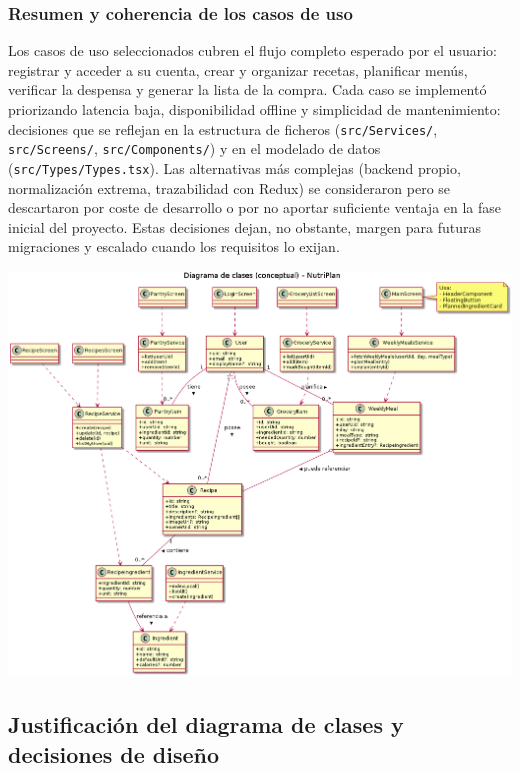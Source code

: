 \documentclass[twoside, openright, 11pt]{report}
\begin{document}
		\subsubsection*{Resumen y coherencia de los casos de uso}
			Los casos de uso seleccionados cubren el flujo completo esperado por el usuario: registrar y acceder a su cuenta, crear y organizar recetas, planificar menús, verificar la despensa y generar la lista de la compra. Cada caso se implementó priorizando latencia baja, disponibilidad offline y simplicidad de mantenimiento: decisiones que se reflejan en la estructura de ficheros (\texttt{src/Services/}, \texttt{src/Screens/}, \texttt{src/Components/}) y en el modelado de datos (\texttt{src/Types/Types.tsx}). Las alternativas más complejas (backend propio, normalización extrema, trazabilidad con Redux) se consideraron pero se descartaron por coste de desarrollo o por no aportar suficiente ventaja en la fase inicial del proyecto. Estas decisiones dejan, no obstante, margen para futuras migraciones y escalado cuando los requisitos lo exijan.
		
		
			\clearpage
			\thispagestyle{empty}
			\noindent
			\includegraphics[width=\paperwidth,height=\paperheight,keepaspectratio]{imagenes/class_diagram}
			\clearpage
			\restoregeometry
		
		\subsection{Justificación del diagrama de clases y decisiones de diseño}
		\label{sec:justificacion_diagrama}
		
\end{document}

